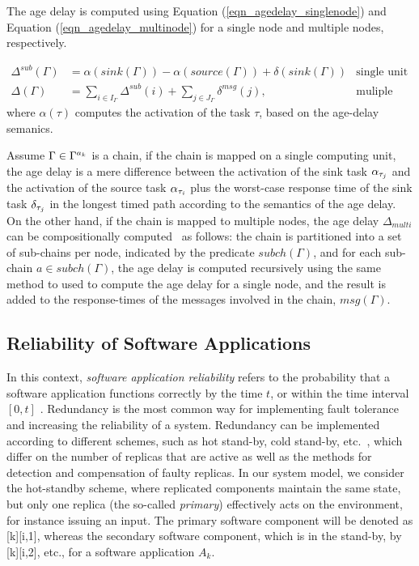 {{The age delay is computed using Equation (\ref{eqn_agedelay_singlenode}) and Equation (\ref{eqn_agedelay_multinode}) for a single node and multiple nodes, respectively.

\begin{align}
	\label{eqn_agedelay_singlenode}
	\Delta^{sub}(\Gamma) &= \alpha(sink(\Gamma))-\alpha(source(\Gamma)) + \delta(sink(\Gamma)) & \text{single unit}\\
	\label{eqn_agedelay_multinode}
	\Delta(\Gamma)&=\sum_{i\in I_{\Gamma}}{\Delta^{sub}(i)} + \sum_{j\in  J_{\Gamma}}{\delta^{msg}(j)}, &\text{muliple units}
\end{align}
where $\alpha(\tau)$ computes the activation of the task $\tau$, based on the age-delay semanics.

Assume $\Gamma \in \ssp{\Gamma}$ is a chain, if the chain is mapped on a single computing unit, the age delay is a mere difference between the activation of the sink task $\ssb{\alpha}[\tau_j]$ and the activation of the source task $\ssb{\alpha}[\tau_i]$ plus the worst-case response time of the sink task $\ssb{\delta}[\tau_j]$ in the longest timed path according to the semantics of the age delay. On the other hand, if the chain is mapped to multiple nodes, the age delay $\Delta_{multi}$ can be compositionally computed~\cite{Feiertag2009ASemantics} as follows: the chain is partitioned  into a set of sub-chains per node, indicated by the predicate $subch(\Gamma)$, and for each sub-chain $a\in subch(\Gamma)$, the age delay is computed recursively using the same method to used to compute the age delay for a single node, and the result is added to the response-times of the messages involved in the chain, $msg(\Gamma)$.

\subsection{Reliability of Software Applications}\label{sub_reliability}
In this context, \textit{software application reliability} refers to the probability that a software application functions correctly by the time $t$, or within the time interval $[0, t]$ \cite{Goel1985SoftwareApplicability}. Redundancy is the most common way for implementing fault tolerance and increasing the reliability of a system. Redundancy can be implemented according to different schemes, such as hot stand-by, cold stand-by, etc.~\cite{Dubrova2013Fault-tolerantDesign}, which differ on the number of replicas that are active as well as the methods for detection and compensation of faulty replicas. In our system model, we consider the hot-standby scheme, where replicated components maintain the same state, but only one replica (the so-called \textit{primary}) effectively acts on the environment, for instance issuing an input. The primary software component will be denoted as [k][i,1], whereas the secondary software component, which is in the stand-by, by [k][i,2], etc., for a software application $A_k$.

}}

